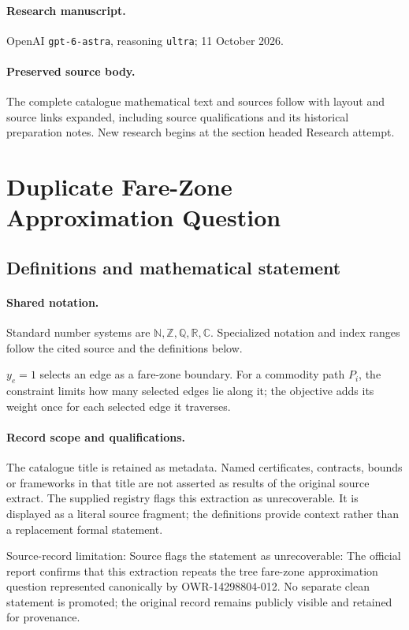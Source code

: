 \documentclass[11pt]{article}
\begin{document}
\paragraph{Research manuscript.} OpenAI \texttt{gpt-6-astra}, reasoning \texttt{ultra}; 11 October 2026.
\paragraph{Preserved source body.} The complete catalogue mathematical text and sources follow with layout and source links expanded, including source qualifications and its historical preparation notes. New research begins at the section headed Research attempt.

\section{Duplicate Fare-Zone Approximation Question}\label{statement}

\subsection{Definitions and mathematical statement}

\paragraph{Shared notation.}Standard number systems are $\mathbb N,\mathbb Z,\mathbb Q,\mathbb R,\mathbb C$. Specialized notation and index ranges follow the cited source and the definitions below.


$y_e=1$ selects an edge as a fare-zone boundary. For a commodity path $P_i$, the constraint limits how many selected edges lie along it; the objective adds its weight once for each selected edge it traverses.
\paragraph{Record scope and qualifications.}
The catalogue title is retained as metadata. Named certificates, contracts, bounds or frameworks in that title are not asserted as results of the original source extract.
The supplied registry flags this extraction as unrecoverable. It is displayed as a literal source fragment; the definitions provide context rather than a replacement formal statement.

Source-record limitation: Source flags the statement as unrecoverable: The official report confirms that this extraction repeats the tree fare-zone approximation question represented canonically by OWR-14298804-012. No separate clean statement is promoted; the original record remains publicly visible and retained for provenance.
\end{document}
